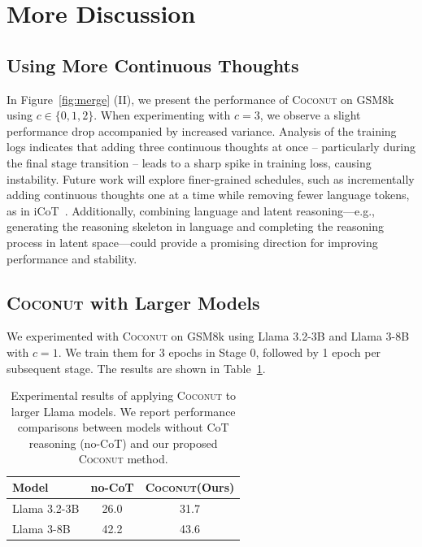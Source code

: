 \documentclass[]{fairmeta}
\newcommand{\ours}{\textsc{Coconut}\xspace}
\begin{document}
\section{More Discussion}
\subsection{Using More Continuous Thoughts}

\label{sec:larger_c}
In Figure~\ref{fig:merge} (II), we present the performance of \ours on GSM8k using $c \in \{0, 1, 2\}$. When experimenting with $c=3$, we observe a slight performance drop accompanied by increased variance. Analysis of the training logs indicates that adding three continuous thoughts at once -- particularly during the final stage transition -- leads to a sharp spike in training loss, causing instability. Future work will explore finer-grained schedules, such as incrementally adding continuous thoughts one at a time while removing fewer language tokens, as in iCoT~\citep{deng2024explicit}. Additionally, combining language and latent reasoning—e.g., generating the reasoning skeleton in language and completing the reasoning process in latent space—could provide a promising direction for improving performance and stability.

\subsection{\ours with Larger Models}

We experimented with \ours on GSM8k using Llama 3.2-3B and Llama 3-8B~\citep{dubey2024llama} with $c=1$. We train them for 3 epochs in Stage 0, followed by 1 epoch per subsequent stage. The results are shown in Table~\ref{tab:coconut-large-models}.

\begin{table}[h]
\centering
\begin{tabular}{lcc}
\toprule
\textbf{Model} & \textbf{no-CoT} & \textbf{\ours (Ours)} \\ 
\midrule
Llama 3.2-3B & 26.0 & 31.7 \\
Llama 3-8B   & 42.2 & 43.6 \\
\bottomrule
\end{tabular}
\caption{Experimental results of applying \ours to larger Llama models. We report performance comparisons between models without CoT reasoning (no-CoT) and our proposed \ours method.}
\label{tab:coconut-large-models}
\end{table}
\end{document}
